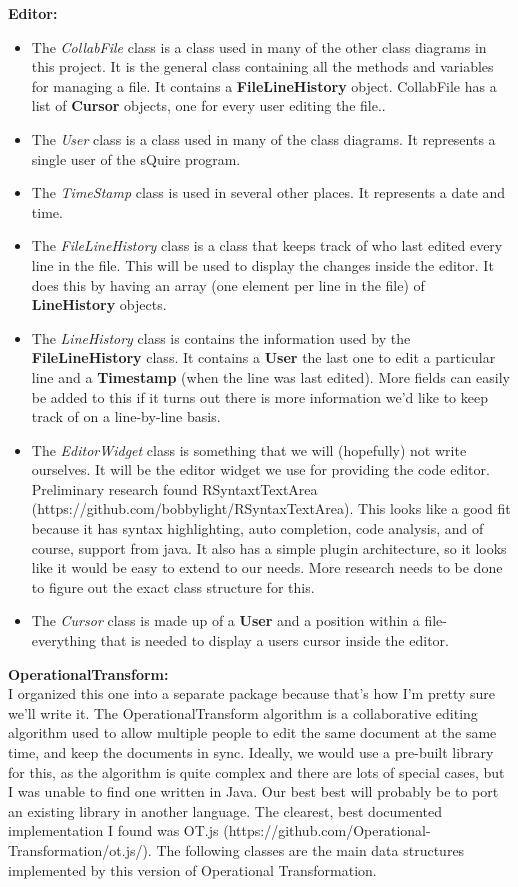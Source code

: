 \documentclass[twoside,letterpaper]{article}
\begin{document}
{\textbf{Editor:}\\
\begin{itemize}
\item The \textit{CollabFile} class is a class used in many of the other class diagrams in this project. It is the general class containing all the methods and variables for managing a file. It contains a \textbf{FileLineHistory} object. CollabFile has a list of \textbf{Cursor} objects, one for every user editing the file..
  \item The \textit{User} class is a class used in many of the class diagrams. It represents a single user of the sQuire program.
  \item The \textit{TimeStamp} class is used in several other places. It represents a date and time.
	\item The \textit{FileLineHistory} class is a class that keeps track of who last edited every line in the file. This will be used to display the changes inside the editor. It does this by having an array (one element per line in the file) of \textbf{LineHistory} objects.
  \item The \textit{LineHistory} class is contains the information used by the \textbf{FileLineHistory} class. It contains a \textbf{User} {the last one to edit a particular line} and a \textbf{Timestamp} (when the line was last edited). More fields can easily be added to this if it turns out there is more information we'd like to keep track of on a line-by-line basis.
	\item The \textit{EditorWidget} class is something that we will (hopefully) not write ourselves. It will be the editor widget we use for providing the code editor. Preliminary research found RSyntaxtTextArea (https://github.com/bobbylight/RSyntaxTextArea). This looks like a good fit because it has syntax highlighting, auto completion, code analysis, and of course, support from java. It also has a simple plugin architecture, so it looks like it would be easy to extend to our needs. More research needs to be done to figure out the exact class structure for this.
  \item The \textit{Cursor} class is made up of a \textbf{User} and a position within a file- everything that is needed to display a users cursor inside the editor.
\end{itemize}
\textbf{OperationalTransform:} \\\bigskip
I organized this one into a separate package because that's how I'm pretty sure we'll write it. The OperationalTransform algorithm is a collaborative editing algorithm used to allow multiple people to edit the same document at the same time, and keep the documents in sync. Ideally, we would use a pre-built library for this, as the algorithm is quite complex and there are lots of special cases, but I was unable to find one written in Java. Our best best will probably be to port an existing library in another language. The clearest, best documented implementation I found was OT.js (https://github.com/Operational-Transformation/ot.js/). The following classes are the main data structures implemented by this version of Operational Transformation.
}
\end{document}
